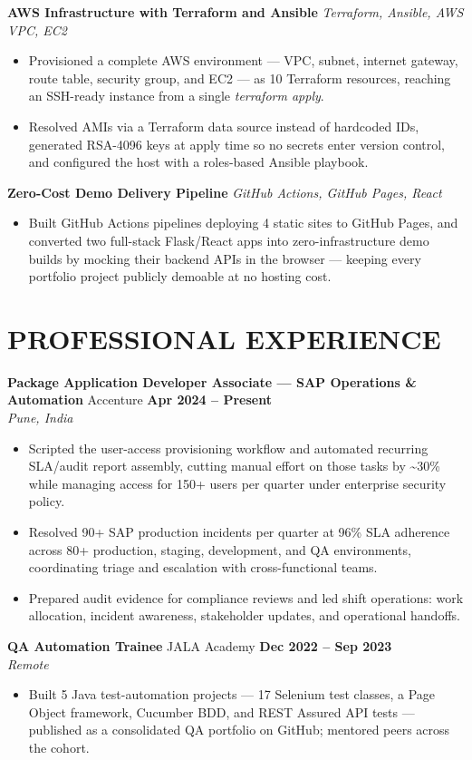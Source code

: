\documentclass[10pt,a4paper]{article}
\newcommand{\entry}[4]{%
  \textbf{#1} \textcolor{rulegray}{\textbar{}} #2 \hfill \textbf{#3}\\[-1pt]
  \textit{\small #4}\par\vspace{1pt}%
}
\newcommand{\project}[2]{%
  \textbf{#1} \textcolor{rulegray}{\textbar{}} \textit{#2}%
}
\begin{document}
\project{AWS Infrastructure with Terraform and Ansible}{Terraform, Ansible, AWS VPC, EC2}
\begin{itemize}
  \item Provisioned a complete AWS environment --- VPC, subnet, internet gateway, route table, security group, and EC2 --- as 10 Terraform resources, reaching an SSH-ready instance from a single \textit{terraform apply}.
  \item Resolved AMIs via a Terraform data source instead of hardcoded IDs, generated RSA-4096 keys at apply time so no secrets enter version control, and configured the host with a roles-based Ansible playbook.
\end{itemize}

\project{Zero-Cost Demo Delivery Pipeline}{GitHub Actions, GitHub Pages, React}
\begin{itemize}
  \item Built GitHub Actions pipelines deploying 4 static sites to GitHub Pages, and converted two full-stack Flask/React apps into zero-infrastructure demo builds by mocking their backend APIs in the browser --- keeping every portfolio project publicly demoable at no hosting cost.
\end{itemize}

\section{PROFESSIONAL EXPERIENCE}
\entry{Package Application Developer Associate --- SAP Operations \& Automation}{Accenture}{Apr 2024 -- Present}{Pune, India}
\begin{itemize}
  \item Scripted the user-access provisioning workflow and automated recurring SLA/audit report assembly, cutting manual effort on those tasks by \textasciitilde30\% while managing access for 150+ users per quarter under enterprise security policy.
  \item Resolved 90+ SAP production incidents per quarter at 96\% SLA adherence across 80+ production, staging, development, and QA environments, coordinating triage and escalation with cross-functional teams.
  \item Prepared audit evidence for compliance reviews and led shift operations: work allocation, incident awareness, stakeholder updates, and operational handoffs.
\end{itemize}

\entry{QA Automation Trainee}{JALA Academy}{Dec 2022 -- Sep 2023}{Remote}
\begin{itemize}
  \item Built 5 Java test-automation projects --- 17 Selenium test classes, a Page Object framework, Cucumber BDD, and REST Assured API tests --- published as a consolidated QA portfolio on GitHub; mentored peers across the cohort.
\end{itemize}
\end{document}
